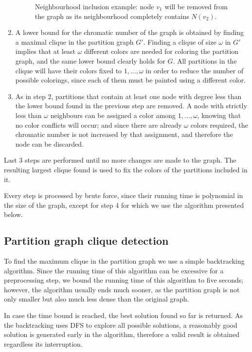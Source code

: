 \begin{enumerate}
\begin{figure}
\begin{tikzpicture}
	\end{tikzpicture} 
\caption{Neighbourhood inclusion example: node $v_1$ will be removed from the graph as its neighbourhood completely contains $N(v_2)$.}
	\label{fig:neighbourinclusion}
\end{figure}
	
	\item{A lower bound for the chromatic number of the graph is obtained by finding a maximal clique in the partition graph $G'$. Finding a clique of size $\omega$ in $G'$ implies that at least $\omega$ different colors are needed for coloring the partition graph, and the same lower bound clearly holds for $G$. All partitions in the clique will have their colors fixed to $1,\ldots,\omega$ in order to reduce the number of possible colorings, since each of them must be painted using a different color.}
	\item{As in step 2, partitions that contain at least one node with degree less than the lower bound found in the previous step are removed. A node with strictly less than $\omega$ neighbours can be assigned a color among $1,\ldots,\omega$, knowing that no color conflicts will occur; and since there are already $\omega$ colors required, the chromatic number is not increased by that assignment, and therefore the node can be discarded.}
\end{enumerate}

Last 3 steps are performed until no more changes are made to the graph. The resulting largest clique found is used to fix the colors of the partitions included in it. 

Every step is processed by brute force, since their running time is polynomial in the size of the graph, except for step 4 for which we use the algorithm presented below.

\subsection{Partition graph clique detection}

To find the maximum clique in the partition graph we use a simple backtracking algorithm. Since the running time of this algorithm can be excessive for a preprocessing step, we bound the running time of this algorithm to five seconds; however, the algorithm usually ends much sooner, as the partition graph is not only smaller but also much less dense than the original graph. 

In case the time bound is reached, the best solution found so far is returned. As the backtracking uses DFS to explore all possible solutions, a reasonably good solution is generated early in the algorithm, therefore a valid result is obtained regardless its interruption.

